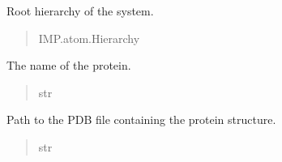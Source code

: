 \documentclass[letterpaper,10pt,english]{sphinxmanual}
\begin{document}
\begin{fulllineitems}
\begin{fulllineitems}
\begin{quote}
\begin{description}
\end{description}\end{quote}

\end{fulllineitems}


\begin{fulllineitems}
\label{\detokenize{src:src.Protein_Class.ProteinStructure.h_root}}
\pysigstartsignatures
{}
\pysigstopsignatures
\sphinxAtStartPar
Root hierarchy of the system.
\begin{quote}\begin{description}
\sphinxAtStartPar
IMP.atom.Hierarchy

\end{description}\end{quote}

\end{fulllineitems}


\begin{fulllineitems}
\label{\detokenize{src:src.Protein_Class.ProteinStructure.name}}
\pysigstartsignatures
{}
\pysigstopsignatures
\sphinxAtStartPar
The name of the protein.
\begin{quote}\begin{description}
\sphinxAtStartPar
str

\end{description}\end{quote}

\end{fulllineitems}


\begin{fulllineitems}
\label{\detokenize{src:src.Protein_Class.ProteinStructure.pdbfile}}
\pysigstartsignatures
{}
\pysigstopsignatures
\sphinxAtStartPar
Path to the PDB file containing the protein structure.
\begin{quote}\begin{description}
\sphinxAtStartPar
str


\end{description}
\end{quote}
\end{fulllineitems}
\end{fulllineitems}
\end{document}

